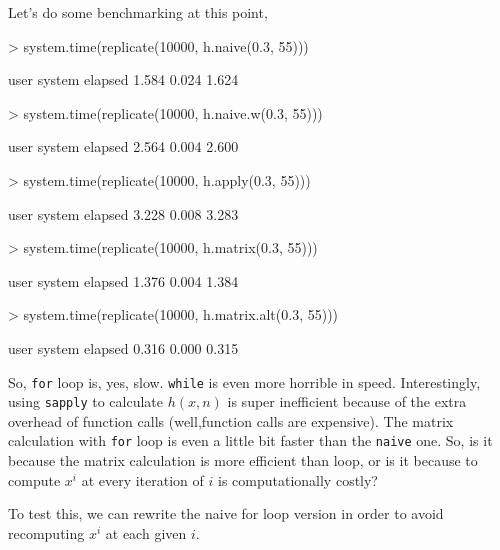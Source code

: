 \documentclass{article}
\begin{document}
Let's do some benchmarking at this point,
\begin{Schunk}
\begin{Sinput}
> system.time(replicate(10000, h.naive(0.3, 55)))
\end{Sinput}
\begin{Soutput}
   user  system elapsed 
  1.584   0.024   1.624 
\end{Soutput}
\begin{Sinput}
> system.time(replicate(10000, h.naive.w(0.3, 55)))
\end{Sinput}
\begin{Soutput}
   user  system elapsed 
  2.564   0.004   2.600 
\end{Soutput}
\begin{Sinput}
> system.time(replicate(10000, h.apply(0.3, 55)))
\end{Sinput}
\begin{Soutput}
   user  system elapsed 
  3.228   0.008   3.283 
\end{Soutput}
\begin{Sinput}
> system.time(replicate(10000, h.matrix(0.3, 55)))
\end{Sinput}
\begin{Soutput}
   user  system elapsed 
  1.376   0.004   1.384 
\end{Soutput}
\begin{Sinput}
> system.time(replicate(10000, h.matrix.alt(0.3, 55)))
\end{Sinput}
\begin{Soutput}
   user  system elapsed 
  0.316   0.000   0.315 
\end{Soutput}
\end{Schunk}

So, \verb=for= loop is, yes, slow. \verb=while= is even more horrible in speed. Interestingly, using \verb=sapply= to calculate $h(x,n)$ is super inefficient because of the extra overhead of function calls (well,function calls are expensive). The matrix calculation with \verb=for= loop is even a little bit faster than the \verb=naive= one. So, is it because the matrix calculation is more efficient than loop, or is it because to compute $x^i$ at every iteration of $i$ is computationally costly? 

To test this, we can rewrite the naive for loop version in order to avoid recomputing $x^i$ at each given $i$.
\end{document}
